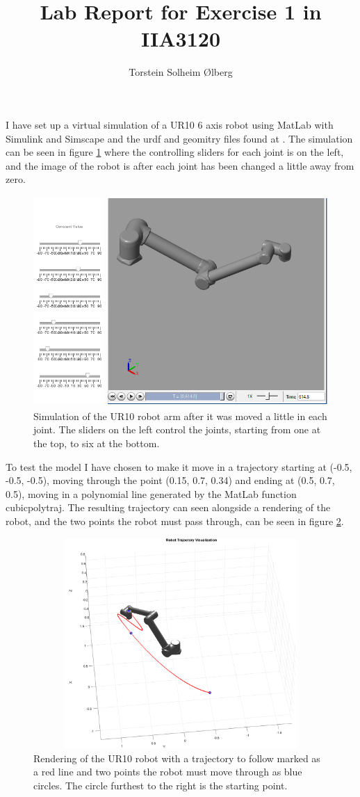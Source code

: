 \documentclass[11pt, A4paper, norsk]{article}
\author{Torstein Solheim Ølberg}
\title{Lab Report for Exercise 1 in IIA3120}
\begin{document}
	\maketitle

I have set up a virtual simulation of a UR10 \cite{UR10} 6 axis robot using MatLab with Simulink and Simscape and the urdf and geomitry files found at \cite{URDF}. The simulation can be seen in figure \ref{fig:sim} where the controlling sliders for each joint is on the left, and the image of the robot is after each joint has been changed a little away from zero.
	\begin{figure}[h!]
\includegraphics[width=13cm, height=8cm]{Robot_Sliders.png}
\caption{Simulation of the UR10 robot arm after it was moved a little in each joint. The sliders on the left control the joints, starting from one at the top, to six at the bottom.}
\label{fig:sim}
	\end{figure}
To test the model I have chosen to make it move in a trajectory starting at (-0.5, -0.5, -0.5), moving through the point (0.15, 0.7, 0.34) and ending at (0.5, 0.7, 0.5), moving in a polynomial line generated by the MatLab function cubicpolytraj. The resulting trajectory can seen alongside a rendering of the robot, and the two points the robot must pass through, can be seen in figure \ref{fig:traj}.
	\begin{figure}[h!]
\includegraphics[width=13cm, height=8cm]{Trajectory figure.png}
\caption{Rendering of the UR10 robot with a trajectory to follow marked as a red line and two points the robot must move through as blue circles. The circle furthest to the right is the starting point.}
\label{fig:traj}
	\end{figure}
\end{document}
